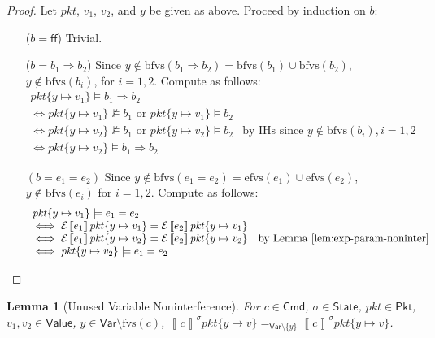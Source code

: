 \documentclass{article}
\newcommand{\pkt}{\mathit{pkt}}
\newcommand{\denote}[1]{\left\llbracket#1\right\rrbracket}
\newcommand{\edenote}[1]{\mathcal{E}\denote{#1}}
\newcommand{\FALSE}{\mathsf{ff}}
\newcommand{\Value}{\mathsf{Value}}
\newcommand{\Cmd}{\mathsf{Cmd}}
\newcommand{\Pkt}{\mathsf{Pkt}}
\newcommand{\Var}{\mathsf{Var}}
\newcommand{\State}{\mathsf{State}}
\newcommand{\fvs}{\textrm{fvs}}
\newcommand{\efvs}{\textrm{efvs}}
\newcommand{\bfvs}{\textrm{bfvs}}
\theoremstyle{plain}
\newtheorem{lemma}{Lemma}
\theoremstyle{definition}
\theoremstyle{remark}
\begin{document}
\begin{proof}
  Let $\pkt$, $v_1$, $v_2$, and $y$ be given as above.
  Proceed by induction on $b$:
  \begin{enumerate}[align=left]
  \item[($b = \FALSE$)] Trivial.
  \item[($b = b_1 \Rightarrow b_2$)] Since $y \not \in\bfvs(b_1 \Rightarrow b_2) =
    \bfvs(b_1) \cup \bfvs(b_2)$, $y \not \in \bfvs(b_i)$, for $i = 1,2$. Compute
    as follows:
    \[\begin{array}{ll}
    \pkt\{y \mapsto v_1\} \models b_1 \Rightarrow b_2 \\
    \iff \pkt\{y \mapsto v_1\} \not\models b_1 \text{ or } \pkt\{y \mapsto v_1\} \models b_2 \\
    \iff \pkt\{y \mapsto v_2\} \not\models b_1 \text{ or } \pkt\{y \mapsto v_2\} \models b_2
    & \text{by IHs since } y \not \in \bfvs(b_i), i = 1,2 \\
    \iff \pkt\{y \mapsto v_2\} \models b_1 \Rightarrow b_2
    \end{array}\]

  \item[$(b = e_1 = e_2)$] Since $y \not \in\bfvs(e_1 = e_2) = \efvs(e_1) \cup
    \efvs(e_2)$, $y \not \in \bfvs(e_i)$ for $i =1,2$. Compute as follows:
    \[\begin{array}{ll}
    \pkt\{y \mapsto v_1\} \models e_1 = e_2 \\
    \iff \edenote{e_1}\pkt\{y \mapsto v_1\} = \edenote{e_2}\pkt\{y \mapsto v_1\} \\
    \iff\edenote{e_1}\pkt\{y \mapsto v_2\} = \edenote{e_2}\pkt\{y \mapsto v_2\} & \text{by Lemma~\ref{lem:exp-param-noninter}} \\
    \iff \pkt\{y\mapsto v_2\} \models e_1 = e_2
    \end{array}
    \]
  \end{enumerate}
\end{proof}

\begin{lemma}[Unused Variable Noninterference]
  \label{lem:param-noninter}
  For $c \in \Cmd$, $\sigma \in \State$, $\pkt \in \Pkt$,
  $v_1,v_2 \in \Value$, $y \in \Var \setminus \fvs(c)$,
  $\denote{c}^\sigma \pkt\{y \mapsto v\} =_{\Var \setminus \{y\}}\denote{c}^\sigma\pkt\{y \mapsto v\}$.
\end{lemma}
\end{document}
